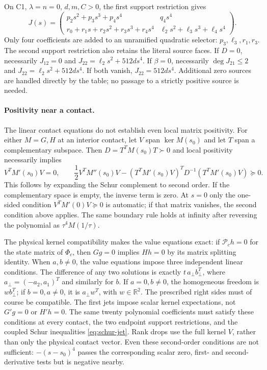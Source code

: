 \documentclass[11pt]{article}
\newcommand{\R}{\mathbb R}
\begin{document}
On C1, $\lambda=n=0$, $d,m,C>0$, the first support restriction gives
\begin{equation}
 J(s)=\begin{pmatrix}
 p_2s^2+p_3s^3+p_4s^4&q_4s^4\\
 r_0+r_1s+r_2s^2+r_3s^3+r_4s^4&\ell_2s^2+\ell_3s^3+\ell_4s^4
 \end{pmatrix}.                                    \label{eq:c1-form}
\end{equation}
Only four coefficients are added to an unramified quadratic selector:
$p_3,\ell_3,r_1,r_3$. The second support restriction also retains
the literal source faces. If $D=0$, necessarily
$J_{12}=0$ and $J_{22}=\ell_2s^2+512ds^4$.
If $\beta=0$, necessarily $\deg J_{21}\le2$ and
$J_{22}=\ell_2s^2+512ds^4$.
If both vanish, $J_{22}=512ds^4$.
Additional zero sources are handled directly by the table; no passage
to a strictly positive source is needed.

\paragraph{Positivity near a contact.}
The linear contact equations do not establish even local matrix
positivity. For either $M=G,H$ at an interior contact, let $V$ span
$\ker M(s_0)$ and let $T$ span a complementary subspace. Then
$D=T^TM(s_0)T\succ0$ and local positivity necessarily implies
\begin{equation}
 V^TM'(s_0)V=0,\qquad
 \frac12V^TM''(s_0)V
 -(T^TM'(s_0)V)^TD^{-1}(T^TM'(s_0)V)\succeq0.       \label{eq:schur-jet}
\end{equation}
This follows by expanding the Schur complement to second order.
If the complementary space is empty, the inverse term is zero.
At $s=0$ only the one-sided condition $V^TM'(0)V\succeq0$ is
automatic; if that matrix vanishes, the second condition above applies.
The same boundary rule holds at infinity after reversing the polynomial
as $\tau^4M(1/\tau)$.

The physical kernel compatibility makes the value equations exact:
if $\mathcal P_c h=0$ for the state matrix of $\Phi_c$, then $Gg=0$
implies $Hh=0$ by its matrix splitting identity.
When $a,b\ne0$, the value equations impose three independent linear
conditions. The difference of any two solutions is exactly
$t\,a_\perp b_\perp^T$, where $a_\perp=(-a_2,a_1)^T$ and similarly
for $b$. If $a=0,b\ne0$, the homogeneous freedom is
$w b_\perp^T$; if $b=0,a\ne0$, it is $a_\perp w^T$, with $w\in\R^2$.
The prescribed right sides must of course be compatible.
The first jets impose scalar kernel expectations, not $G'g=0$ or
$H'h=0$. The same twenty polynomial
coefficients must satisfy these conditions at every contact, the two
endpoint support restrictions, and the coupled Schur inequalities
\eqref{eq:schur-jet}. Rank drops use the full kernel $V$, rather than
only the physical contact vector. Even these second-order conditions
are not sufficient: $-(s-s_0)^4$ passes the corresponding scalar
zero, first- and second-derivative tests but is negative nearby.
\end{document}

